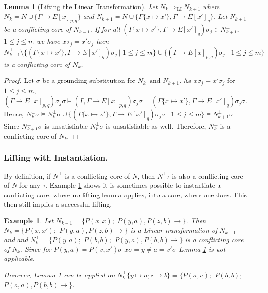 \documentclass{llncs}
\newcommand{\sat}{\vDash}
\newcommand{\imp}{\rightarrow}
\newtheorem{lem}[theorem]{Lemma}
\newtheorem{exmp}{Example}
\begin{document}
\begin{lem}[Lifting the Linear Transformation]\label{liftlin}
Let $N_k\Rightarrow_{\text{LI}} N_{k+1}$ where $N_k = N\cup\{\Gamma \imp E[x]_{p,q}\}$ and $N_{k+1} = N\cup\{\Gamma\{x \mapsto x'\},\Gamma \imp E[x']_q\}$.
Let $N^\bot_{k+1}$ be a conflicting core of $N_{k+1}$.
If for all $(\Gamma\{x \mapsto x'\},\Gamma \imp E[x']_q)\sigma_j\in N^\bot_{k+1}$, $1\leq j\leq m$ we have $x\sigma_j = x'\sigma_j$ then
$N^\bot_{k+1}\setminus\{(\Gamma\{x \mapsto x'\},\Gamma \imp E[x']_q)\sigma_j \mid 1\leq j\leq m\}\cup\{(\Gamma \imp E[x]_{p,q})\sigma_j\mid 1\leq j\leq m\}$ is a conflicting core of $N_k$.
\end{lem}

\begin{proof}
Let $\sigma$ be a grounding substitution for $N^\bot_{k}$ and $N^\bot_{k+1}$. 
As $x\sigma_j = x'\sigma_j$ for $1\leq j\leq m$, $(\Gamma \imp E[x]_{p,q})\sigma_j\sigma \sat (\Gamma,\Gamma \imp E[x]_{p,q})\sigma_j\sigma = (\Gamma\{x \mapsto x'\},\Gamma \imp E[x']_q)\sigma_j\sigma $.
Hence, $N^\bot_{k}\sigma \sat N^\bot_{k}\sigma \cup \{(\Gamma\{x \mapsto x'\},\Gamma \imp E[x']_q)\sigma_j\sigma \mid 1\leq j\leq m\} \sat N^\bot_{k+1}\sigma$.
Since $N^\bot_{k+1}\sigma$ is unsatisfiable $N^\bot_{k}\sigma$ is unsatisfiable as well.
Therefore,  $N^\bot_{k}$ is a conflicting core of $N_k$.
\end{proof}

\subsubsection{Lifting with Instantiation.}
By definition, if $N^\bot$ is a conflicting core of $N$, then $N^\bot\tau$ is also a conflicting core of $N$ for any $\tau$. 
Example \ref{liftex} shows it is sometimes possible to instantiate a conflicting core, where no lifting lemma applies, into a core, where one does.
This then still implies a successful lifting.

\begin{exmp}\label{liftex}
Let $N_{k-1} = \{ P(x,x);$ $P(y,a),P(z,b) \imp \}$. 
Then $N_k=  \{ P(x,x');$ $P(y,a),P(z,b) \imp \}$ is a Linear transformation of $N_{k-1} $ and
and  $N^\bot_k=\{ P(y,a);$ $P(b,b);$ $P(y,a),P(b,b)\imp\}$ is a conflicting core of $N_k$.
Since for $P(y,a)= P(x,x')\sigma$ $x\sigma=y\neq a=x'\sigma$ Lemma \ref{liftlin} is not applicable.

However,  Lemma \ref{liftlin} can be applied on $N^\bot_k\{y \mapsto a; z \mapsto b\}= \{P(a,a);$ $P(b,b);$ $P(a,a),P(b,b)\imp\}$.
\end{exmp} 
\end{document}
